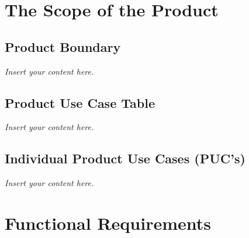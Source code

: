 \documentclass[12pt]{article}
\newcommand{\lips}{\textit{Insert your content here.}}
\begin{document}
\section{The Scope of the Product}
\subsection{Product Boundary}
\lips
\subsection{Product Use Case Table}
\lips
\subsection{Individual Product Use Cases (PUC's)}
\lips
\section{Functional Requirements}
\end{document}
